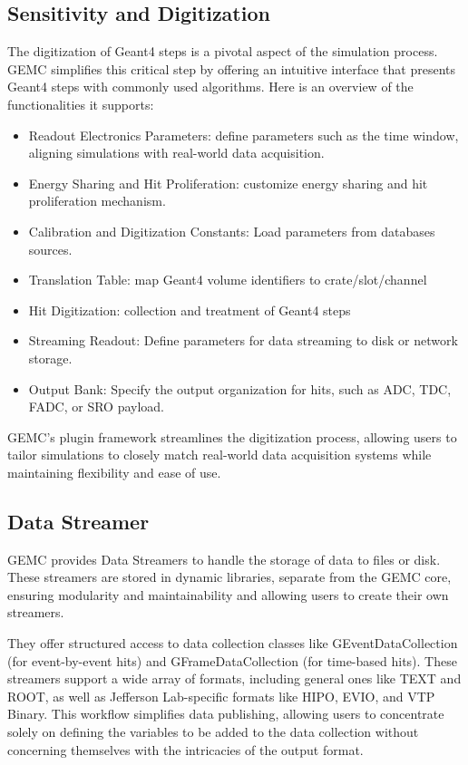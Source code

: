 \subsection{Sensitivity and Digitization}
\label{subsec:digitization}

The digitization of Geant4 steps is a pivotal aspect of the simulation process.
GEMC simplifies this critical step by offering an intuitive interface that presents Geant4 steps
with commonly used algorithms.
Here is an overview of the functionalities it supports:

\begin{itemize}
    \item Readout Electronics Parameters: define parameters such as the time window,
    aligning simulations with real-world data acquisition.
    \item Energy Sharing and Hit Proliferation: customize energy sharing and hit proliferation mechanism.
    \item Calibration and Digitization Constants: Load parameters from databases sources.
    \item Translation Table: map Geant4 volume identifiers to crate/slot/channel
    \item Hit Digitization: collection and treatment of Geant4 steps
    \item Streaming Readout: Define parameters for data streaming to disk or network storage.
    \item Output Bank: Specify the output organization for hits, such as ADC, TDC, FADC, or SRO payload.
\end{itemize}

GEMC's plugin framework streamlines the digitization process, allowing users to tailor simulations
to closely match real-world data acquisition systems while maintaining flexibility and ease of use.

\subsection{Data Streamer}
\label{subsec:data_streamer}

GEMC provides Data Streamers to handle the storage of data to files or disk.
These streamers are stored in dynamic libraries, separate from the GEMC core, ensuring modularity
and maintainability and allowing users to create their own streamers.

They offer structured access to data collection classes like GEventDataCollection (for event-by-event hits)
and GFrameDataCollection (for time-based hits).
These streamers support a wide array of formats, including general ones like TEXT and ROOT,
as well as Jefferson Lab-specific formats like HIPO, EVIO, and VTP Binary.
This workflow simplifies data publishing, allowing users to concentrate solely on defining the variables to be
added to the data collection without concerning themselves with the intricacies of the output format.

